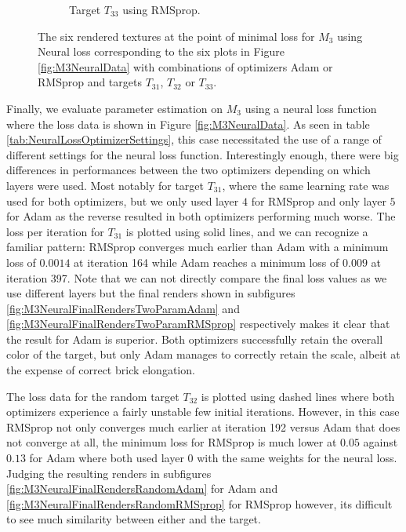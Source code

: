 \begin{figure}[h]
\begin{subfigure}[t]{.25\textwidth}
    \caption{Target $T_{33}$ using RMSprop.}
    \label{fig:M3NeuralFinalRendersRealLifeRMSprop}
\end{subfigure}
\caption{The six rendered textures at the point of minimal loss for $M_3$ using Neural loss corresponding to the six plots in Figure \ref{fig:M3NeuralData} with combinations of optimizers Adam or RMSprop and targets $T_{31}$, $T_{32}$ or $T_{33}$.}
\label{fig:M3NeuralFinalRenders}
\end{figure}

Finally, we evaluate parameter estimation on $M_3$ using a neural loss function where the loss data is shown in Figure \ref{fig:M3NeuralData}. As seen in table \ref{tab:NeuralLossOptimizerSettings}, this case necessitated the use of a range of different settings for the neural loss function. Interestingly enough, there were big differences in performances between the two optimizers depending on which layers were used. Most notably for target $T_{31}$, where the same learning rate was used for both optimizers, but we only used layer $4$ for RMSprop and only layer $5$ for Adam as the reverse resulted in both optimizers performing much worse. The loss per iteration for $T_{31}$ is plotted using solid lines, and we can recognize a familiar pattern: RMSprop converges much earlier than Adam with a minimum loss of $0.0014$ at iteration 164 while Adam reaches a minimum loss of $0.009$ at iteration 397. Note that we can not directly compare the final loss values as we use different layers but the final renders shown in subfigures \ref{fig:M3NeuralFinalRendersTwoParamAdam} and \ref{fig:M3NeuralFinalRendersTwoParamRMSprop} respectively makes it clear that the result for Adam is superior. Both optimizers successfully retain the overall color of the target, but only Adam manages to correctly retain the scale, albeit at the expense of correct brick elongation. 

The loss data for the random target $T_{32}$ is plotted using dashed lines where both optimizers experience a fairly unstable few initial iterations. However, in this case RMSprop not only converges much earlier at iteration 192 versus Adam that does not converge at all, the minimum loss for RMSprop is much lower at $0.05$ against $0.13$ for Adam where both used layer $0$ with the same weights for the neural loss. Judging the resulting renders in subfigures \ref{fig:M3NeuralFinalRendersRandomAdam} for Adam and \ref{fig:M3NeuralFinalRendersRandomRMSprop} for RMSprop however, its difficult to see much similarity between either and the target.

